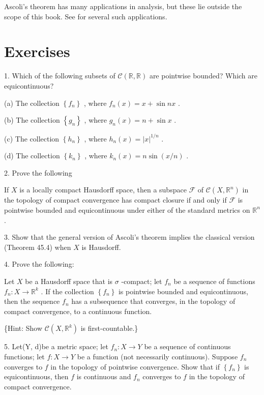 Ascoli's theorem has many applications in analysis, but these lie outside the scope of this book. See 		\cite{KolmogorovFomin1957} for several such applications.

\section*{Exercises}

1. Which of the following subsets of \(\mathcal{C}\left( {\mathbb{R},\mathbb{R}}\right)\) are pointwise bounded? Which are equicontinuous?

(a) The collection \(\left\{  {f}_{n}\right\}\) , where \({f}_{n}\left( x\right)  = x + \sin {nx}\) .

(b) The collection \(\left\{  {g}_{n}\right\}\) , where \({g}_{n}\left( x\right)  = n + \sin x\) .

(c) The collection \(\left\{  {h}_{n}\right\}\) , where \({h}_{n}\left( x\right)  = {\left| x\right| }^{1/n}\) .

(d) The collection \(\left\{  {k}_{n}\right\}\) , where \({k}_{n}\left( x\right)  = n\sin \left( {x/n}\right)\) .

2. Prove the following

\begin{theorem} If \(X\) is a locally compact Hausdorff space, then a subspace \(\mathcal{F}\) of \(\mathcal{C}\left( {X,{\mathbb{R}}^{n}}\right)\) in the topology of compact convergence has compact closure if and only if \(\mathcal{F}\) is pointwise bounded and equicontinuous under either of the standard metrics on \({\mathbb{R}}^{n}\) .
\end{theorem}

3. Show that the general version of Ascoli’s theorem implies the classical version (Theorem 45.4) when \(X\) is Hausdorff.

4. Prove the following:

\begin{theorem} Let \(X\) be a Hausdorff space that is \(\sigma\) -compact; let \({f}_{n}\) be a sequence of functions \({f}_{n} : X \rightarrow  {\mathbb{R}}^{k}\) . If the collection \(\left\{  {f}_{n}\right\}\) is pointwise bounded and equicontinuous, then the sequence \({f}_{n}\) has a subsequence that converges, in the topology of compact convergence, to a continuous function.
\end{theorem}

\{Hint: Show \(\mathcal{C}\left( {X,{\mathbb{R}}^{k}}\right)\) is first-countable.\}

5. Let(Y, d)be a metric space; let \({f}_{n} : X \rightarrow  Y\) be a sequence of continuous functions; let \(f : X \rightarrow  Y\) be a function (not necessarily continuous). Suppose \({f}_{n}\) converges to \(f\) in the topology of pointwise convergence. Show that if \(\left\{  {f}_{n}\right\}\) is equicontinuous, then \(f\) is continuous and \({f}_{n}\) converges to \(f\) in the topology of compact convergence.